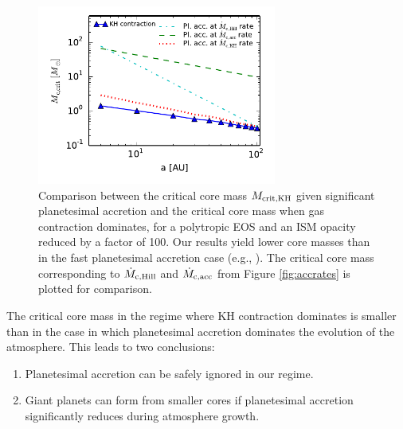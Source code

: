  \begin{figure}[H]
\centering
\includegraphics[width=0.7\textwidth]{figures/Mc_vs_a_poly_comp.pdf}
\caption{Comparison between the critical core mass $M_{\rm{crit, KH}}$ given significant planetesimal accretion and the critical core mass when gas contraction dominates, for a polytropic EOS and an ISM opacity reduced by a factor of 100. Our results yield lower core masses than in the fast planetesimal accretion case (e.g., \citealt{rafikov06}). The critical core mass corresponding to $\dot{M}_{\rm c, Hill}$ and $\dot{M}_{\rm c, acc}$ from Figure \ref{fig:accrates} is plotted for comparison.}
\label{fig:raf2}
\end{figure}

The critical core mass in the regime where KH contraction dominates is smaller than in the case in which planetesimal accretion dominates the evolution of the atmosphere. This leads to two conclusions:

\begin{enumerate}
\item Planetesimal accretion can be safely ignored in our regime.
\item Giant planets can form from smaller cores if planetesimal accretion significantly reduces during atmosphere growth. 
\end{enumerate}





